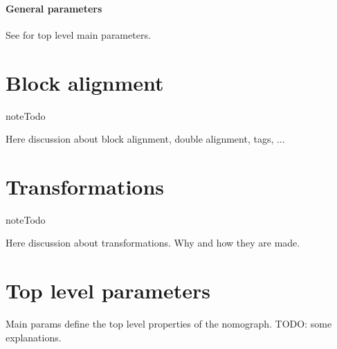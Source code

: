 \documentclass[a4paper,11pt,english]{sphinxmanual}
\begin{document}
\subsubsection{General parameters}
\label{types/types:id53}
See {\hyperref[main_params:main-params]{\emph{}}} for top level main parameters.


\chapter{Block alignment}
\label{alignment/alignment:block-alignment}\label{alignment/alignment::doc}
\begin{notice}{note}{Todo}

Here discussion about block alignment, double alignment, tags, ...
\end{notice}


\chapter{Transformations}
\label{transformations/transformations::doc}\label{transformations/transformations:transformations}
\begin{notice}{note}{Todo}

Here discussion about transformations. Why and how they are made.
\end{notice}


\chapter{Top level parameters}
\label{main_params:top-level-parameters}\label{main_params::doc}
Main params define the top level properties of the nomograph. TODO: some explanations.
\end{document}

